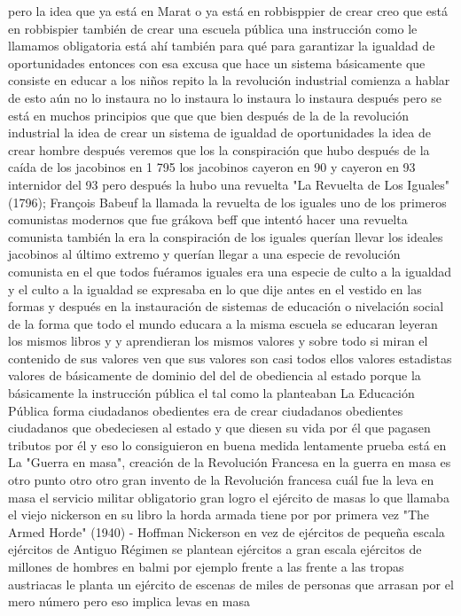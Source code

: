 pero la idea que ya está en Marat o ya está en robbisppier de crear creo que está en robbispier también de crear una escuela pública
una instrucción como le llamamos obligatoria está ahí también para qué para garantizar la igualdad
de oportunidades entonces con esa excusa que hace un sistema básicamente que consiste en educar a los niños
repito la la revolución industrial comienza a hablar de esto aún no lo instaura no lo instaura lo instaura lo instaura después
pero se está en muchos principios que que que bien después de la de la revolución industrial la idea de crear un sistema de igualdad
de oportunidades la idea de crear hombre después veremos que los la conspiración
que hubo después de la caída de los jacobinos en 1 795 los jacobinos cayeron en 90 y
cayeron en 93 internidor del 93 pero después la hubo una revuelta
"La Revuelta de Los Iguales" (1796); François Babeuf
la llamada la revuelta de los iguales uno de los primeros comunistas modernos que fue grákova beff
que intentó hacer una revuelta comunista también la era la conspiración de los iguales querían llevar los ideales jacobinos al último extremo
y querían llegar a una especie de revolución comunista en el que todos fuéramos iguales era una especie de culto a la igualdad y el culto a la igualdad
se expresaba en lo que dije antes en el vestido en las formas y después en la instauración de sistemas de educación
o nivelación social de la forma que todo el mundo educara a la misma escuela se educaran leyeran los mismos libros
y y aprendieran los mismos valores y sobre todo si miran el contenido de sus valores ven que sus valores son casi todos ellos
valores estadistas valores de básicamente de dominio del
del de obediencia al estado porque la básicamente la instrucción pública el tal como la planteaban
La Educación Pública forma ciudadanos obedientes
era de crear ciudadanos obedientes ciudadanos que obedeciesen al estado y que diesen su vida por él
que pagasen tributos por él y eso lo consiguieron en buena medida lentamente prueba está en
La "Guerra en masa", creación de la Revolución Francesa
en la guerra en masa es otro punto otro otro gran invento de la Revolución francesa cuál fue la leva en masa
el servicio militar obligatorio gran logro el ejército de masas
lo que llamaba el viejo nickerson en su libro la horda armada tiene por por primera vez
"The Armed Horde" (1940) - Hoffman Nickerson
en vez de ejércitos de pequeña escala ejércitos de Antiguo Régimen se plantean ejércitos a gran escala
ejércitos de millones de hombres en balmi por ejemplo frente a las frente a las tropas austriacas
le planta un ejército de escenas de miles de personas que arrasan por el mero número pero eso implica levas en masa
